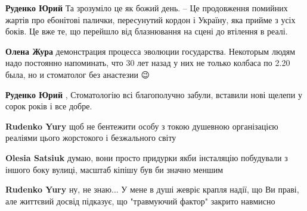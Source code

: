 \begin{itemize}
\begin{itemize}
\textbf{Руденко Юрий}
Та зрозуміло це як божий день.
– Це продовження помийних жартів про ебонітові палички, пересунутий кордон і Україну, яка прийме з усіх боків. Це вже те, що перейшло від блазнювання на сцені до втілення в реалі.

 
\textbf{Олена Жура} демонстрация процесса эволюции государства. Некоторым людям надо постоянно напоминать, что 30 лет назад у них не только колбаса по 2.20 была, но и стоматолог без анастезии 😉

 
\textbf{Руденко Юрий} , Стоматологію всі благополучно забули, вставили нові щелепи у сорок років і все добре.

 
\textbf{Rudenko Yury} щоб не бентежити особу з токою душевною організацією реаліями цього жорстокого і безжального світу

 
\textbf{Olesia Satsiuk} думаю, вони просто придурки \Smiley[1.0][yellow] якби інсталяцію побудували з іншого боку вулиці, масштаб кіпішу був би значно меншим

 
\textbf{Rudenko Yury} ну, не знаю... У мене в душі жевріє крапля надії, що Ви праві, але життєвий досвід підказує, що "травмуючий фактор" закрито навмисно🙁


\end{itemize}
\end{itemize}
